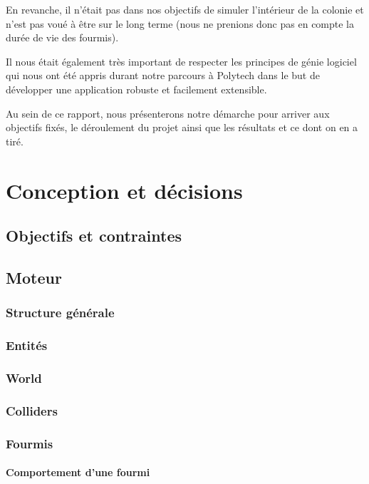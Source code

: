 \documentclass{EPUProjetDi}
\begin{document}
En revanche, il n'était pas dans nos objectifs de simuler l'intérieur de la colonie et n'est pas voué à être sur le long terme
(nous ne prenions donc pas en compte la durée de vie des fourmis).

Il nous était également très important de respecter les principes de génie logiciel qui nous ont été appris durant notre
parcours à Polytech dans le but de développer une application robuste et facilement extensible.

Au sein de ce rapport, nous présenterons notre démarche pour arriver aux objectifs fixés, le déroulement du projet ainsi que les résultats 
et ce dont on en a tiré.

\chapter{Conception et décisions}

\section{Objectifs et contraintes}

\section{Moteur}

\subsection{Structure générale}

\subsection{Entités}

\subsection{World}

\subsection{Colliders}

\subsection{Fourmis}

\subsubsection{Comportement d'une fourmi}
\end{document}
